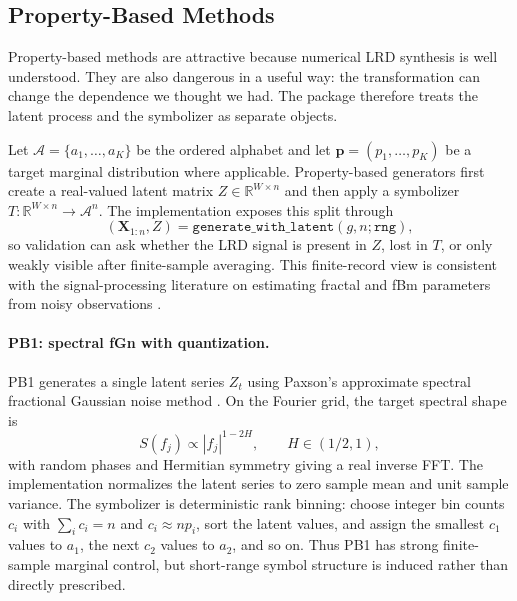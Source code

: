 \documentclass[journal]{IEEEtran}
\newcommand{\code}[1]{\texttt{#1}}
\newcommand{\vect}[1]{\boldsymbol{#1}}
\begin{document}
\subsection{Property-Based Methods}

Property-based methods are attractive because numerical LRD synthesis is well
understood.  They are also dangerous in a useful way: the transformation can
change the dependence we thought we had.  The package therefore treats the
latent process and the symbolizer as separate objects.

Let $\mathcal{A}=\{a_1,\ldots,a_K\}$ be the ordered alphabet and let
\(\vect{p}=(p_1,\ldots,p_K)\) be a target marginal distribution where applicable.
Property-based generators first create a real-valued latent matrix
$Z\in\mathbb{R}^{W\times n}$ and then apply a symbolizer
$T:\mathbb{R}^{W\times n}\rightarrow\mathcal{A}^n$. The implementation exposes
this split through
\[
  (\vect{X}_{1:n},Z) = \code{generate\_with\_latent}(g,n;\code{rng}),
\]
so validation can ask whether the LRD signal is present in $Z$, lost in $T$, or
only weakly visible after finite-sample averaging. This finite-record view is
consistent with the signal-processing literature on estimating fractal and fBm
parameters from noisy observations
\cite{wornell1992_estimation,kaplan1993_fractal,chang2002_fast}.

\paragraph{PB1: spectral fGn with quantization.}
PB1 generates a single latent series $Z_t$ using Paxson's approximate spectral
fractional Gaussian noise method \cite{paxson1997_fast}. On the Fourier grid,
the target spectral shape is
\begin{equation}
  S(f_j) \propto |f_j|^{1-2H}, \qquad H\in(1/2,1),
\end{equation}
with random phases and Hermitian symmetry giving a real inverse FFT. The
implementation normalizes the latent series to zero sample mean and unit sample
variance. The symbolizer is deterministic rank binning: choose integer bin
counts $c_i$ with $\sum_i c_i=n$ and $c_i\approx n p_i$, sort the latent values,
and assign the smallest $c_1$ values to $a_1$, the next $c_2$ values to $a_2$,
and so on. Thus PB1 has strong finite-sample marginal control, but short-range
symbol structure is induced rather than directly prescribed.
\end{document}
